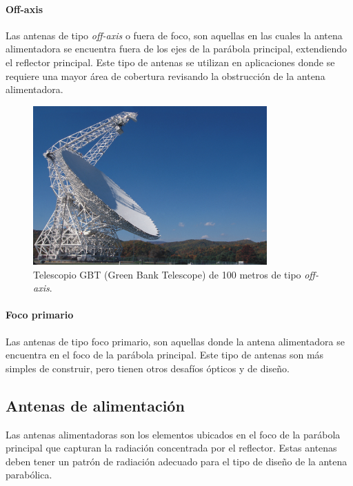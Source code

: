 \paragraph{Off-axis}

Las antenas de tipo \textit{off-axis} o fuera de foco, son aquellas en las cuales la antena alimentadora se encuentra fuera de los ejes de la parábola principal, extendiendo el reflector principal. Este tipo de antenas se utilizan en aplicaciones donde se requiere una mayor área de cobertura revisando la obstrucción de la antena alimentadora.

\begin{figure}
    \centering
    \includegraphics[width = 0.8\textwidth]{img/off-axis.jpg}
    \caption{Telescopio GBT (Green Bank Telescope) de 100 metros de tipo \textit{off-axis}.}
    \label{fig:off}
\end{figure}


\paragraph{Foco primario}

Las antenas de tipo foco primario, son aquellas donde la antena alimentadora se encuentra en el foco de la parábola principal. Este tipo de antenas son más simples de construir, pero tienen otros desafíos ópticos y de diseño.\\

\subsection{Antenas de alimentación}

Las antenas alimentadoras son los elementos ubicados en el foco de la parábola principal que capturan la radiación concentrada por el reflector. Estas antenas deben tener un patrón de radiación adecuado para el tipo de diseño de la antena parabólica.\\

